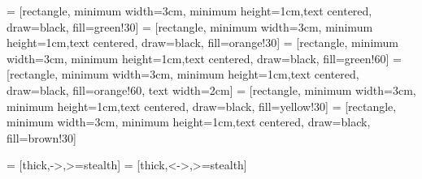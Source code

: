  = [rectangle, minimum width=3cm, minimum height=1cm,text centered, draw=black, fill=green!30]
 = [rectangle, minimum width=3cm, minimum height=1cm,text centered, draw=black, fill=orange!30]
 = [rectangle, minimum width=3cm, minimum height=1cm,text centered, draw=black, fill=green!60]
 = [rectangle, minimum width=3cm, minimum height=1cm,text centered, draw=black, fill=orange!60, text width=2cm]
 = [rectangle, minimum width=3cm, minimum height=1cm,text centered, draw=black, fill=yellow!30]
 = [rectangle, minimum width=3cm, minimum height=1cm,text centered, draw=black, fill=brown!30]

 = [thick,->,>=stealth]
 = [thick,<->,>=stealth]



